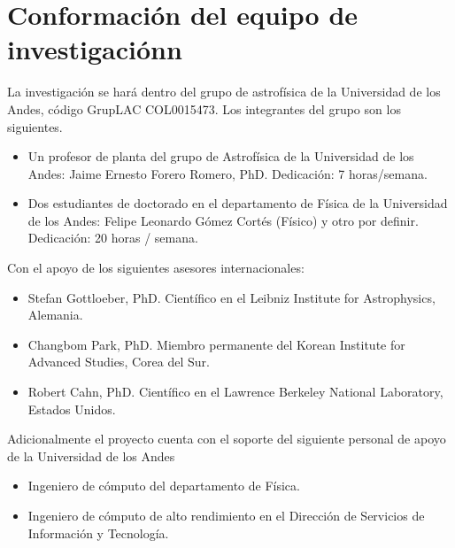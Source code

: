 \section{Conformaci\'on del equipo de investigaci\'onn}

La investigaci\'on se har\'a dentro del grupo de astrof\'isica de la
Universidad de los Andes, c\'odigo GrupLAC COL0015473. Los integrantes
del grupo son los siguientes. 


\begin{itemize}
\item Un profesor de planta del grupo de Astrof\'isica de la
  Universidad de los Andes: Jaime Ernesto  Forero Romero, PhD.
  Dedicaci\'on: 7 horas/semana.
\item Dos estudiantes de doctorado en el departamento de F\'isica de
  la Universidad de los Andes: Felipe Leonardo G\'omez Cort\'es
  (F\'isico) y otro por   definir.  Dedicaci\'on: 20 horas / semana. 
\end{itemize}

\noindent
Con el apoyo de los siguientes asesores internacionales:

\begin{itemize}

\item Stefan Gottloeber, PhD. Cient\'ifico en el Leibniz Institute for
  Astrophysics, Alemania.  
\item Changbom Park, PhD. Miembro permanente del Korean Institute for
  Advanced Studies, Corea del Sur. 
\item Robert Cahn, PhD. Cient\'ifico en el Lawrence Berkeley National
  Laboratory, Estados   Unidos. 
\end{itemize}

\noindent
Adicionalmente el proyecto cuenta con el soporte del siguiente
personal de apoyo de la Universidad de los Andes 

\begin{itemize}
\item{Ingeniero de c\'omputo del departamento de F\'isica.}
\item{Ingeniero de c\'omputo de alto rendimiento en el Direcci\'on de
  Servicios de Informaci\'on y Tecnolog\'ia.}
\end{itemize}

